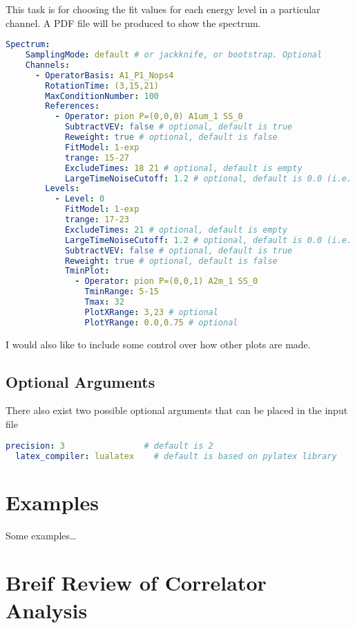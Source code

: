 \documentclass[12pt,letterpaper,notitlepage]{article}
\begin{document}
This task is for choosing the fit values for each energy level in a particular channel.
A \textsc{PDF} file will be produced to show the spectrum.
\begin{lstlisting}[language=yaml]
  Spectrum:
    SamplingMode: default # or jackknife, or bootstrap. Optional
    Channels:
      - OperatorBasis: A1_P1_Nops4
        RotationTime: (3,15,21)
        MaxConditionNumber: 100
        References:
          - Operator: pion P=(0,0,0) A1um_1 SS_0
            SubtractVEV: false # optional, default is true
            Reweight: true # optional, default is false
            FitModel: 1-exp
            trange: 15-27
            ExcludeTimes: 18 21 # optional, default is empty
            LargeTimeNoiseCutoff: 1.2 # optional, default is 0.0 (i.e. no cutoff)
        Levels:
          - Level: 0
            FitModel: 1-exp
            trange: 17-23
            ExcludeTimes: 21 # optional, default is empty
            LargeTimeNoiseCutoff: 1.2 # optional, default is 0.0 (i.e. no cutoff)
            SubtractVEV: false # optional, default is true
            Reweight: true # optional, default is false
            TminPlot:
              - Operator: pion P=(0,0,1) A2m_1 SS_0
                TminRange: 5-15
                Tmax: 32
                PlotXRange: 3,23 # optional
                PlotYRange: 0.0,0.75 # optional
\end{lstlisting}
I would also like to include some control over how other plots are made.

\subsection{Optional Arguments}
There also exist two possible optional arguments that can be placed in the input file
\begin{lstlisting}[language=yaml]
  precision: 3                # default is 2
  latex_compiler: lualatex    # default is based on pylatex library
\end{lstlisting}

\section{Examples}

Some examples\ldots

\newpage
\appendix

\section{Breif Review of Correlator Analysis}
\label{appsec:review}
\end{document}
